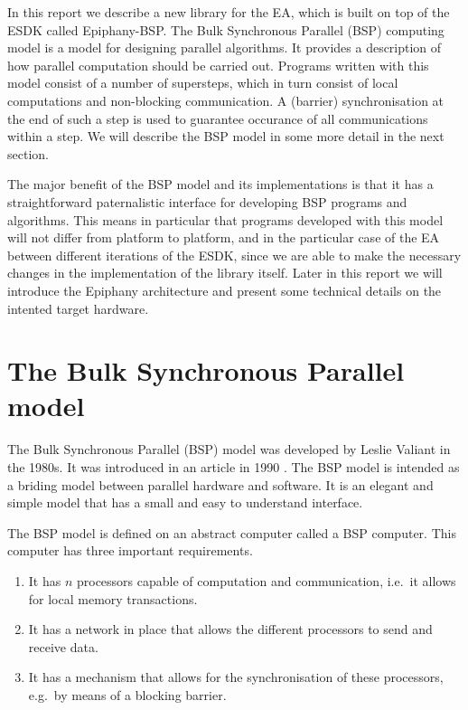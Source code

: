 \documentclass[fleqn]{article}
\renewcommand{\(}{\left(}
\renewcommand{\)}{\right)}
\begin{document}
In this report we describe a new library for the EA, which is built on top of the ESDK called Epiphany-BSP. The Bulk Synchronous Parallel (BSP) computing model is a model for designing parallel algorithms. It provides a description of how parallel computation should be carried out. Programs written with this model consist of a number of supersteps, which in turn consist of local computations and non-blocking communication. A (barrier) synchronisation at the end of such a step is used to guarantee occurance of all communications within a step. We will describe the BSP model in some more detail in the next section. 

The major benefit of the BSP model and its implementations is that it has a straightforward paternalistic interface for developing BSP programs and algorithms. This means in particular that programs developed with this model will not differ from platform to platform, and in the particular case of the EA between different iterations of the ESDK, since we are able to make the necessary changes in the implementation of the library itself. Later in this report we will introduce the Epiphany architecture and present some technical details on the intented target hardware.

\section{The Bulk Synchronous Parallel model}

The Bulk Synchronous Parallel (BSP) model was developed by Leslie Valiant in the 1980s. It was introduced in an article in 1990 \cite{bsp:valiant}. The BSP model is intended as a briding model between parallel hardware and software. It is an elegant and simple model that has a small and easy to understand interface.

The BSP model is defined on an abstract computer called a BSP computer. This computer has three important requirements.
\begin{enumerate}[1.]
\item It has $n$ processors capable of computation and communication, i.e.\ it allows for local memory transactions.
\item It has a network in place that allows the different processors to send and receive data.
\item It has a mechanism that allows for the synchronisation of these processors, e.g.\ by means of a blocking barrier.
\end{enumerate}
\end{document}
